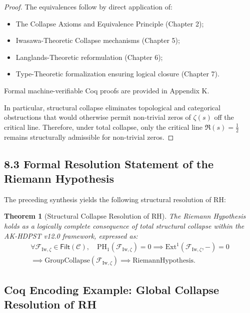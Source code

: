 \documentclass[11pt]{article}
\newtheorem{theorem}{Theorem}[section]
\begin{document}
\begin{proof}
The equivalences follow by direct application of:
\begin{itemize}
    \item The Collapse Axioms and Equivalence Principle (Chapter 2);
    \item Iwasawa-Theoretic Collapse mechanisms (Chapter 5);
    \item Langlands-Theoretic reformulation (Chapter 6);
    \item Type-Theoretic formalization ensuring logical closure (Chapter 7).
\end{itemize}
Formal machine-verifiable Coq proofs are provided in Appendix K.

In particular, structural collapse eliminates topological and categorical obstructions that would otherwise permit non-trivial zeros of $\zeta(s)$ off the critical line. Therefore, under total collapse, only the critical line $\Re(s) = \tfrac{1}{2}$ remains structurally admissible for non-trivial zeros.
\end{proof}

\subsection*{8.3 Formal Resolution Statement of the Riemann Hypothesis}

The preceding synthesis yields the following structural resolution of RH:

\begin{theorem}[Structural Collapse Resolution of RH]
The Riemann Hypothesis holds as a logically complete consequence of total structural collapse within the AK-HDPST v12.0 framework, expressed as:
\begin{multline*}
\forall \mathcal{F}_{\mathrm{Iw}, \zeta} \in \mathsf{Filt}(\mathcal{C}), \quad 
\mathrm{PH}_1(\mathcal{F}_{\mathrm{Iw}, \zeta}) = 0 
\implies \mathrm{Ext}^1(\mathcal{F}_{\mathrm{Iw}, \zeta}, -) = 0 \\
\implies \mathrm{GroupCollapse}(\mathcal{F}_{\mathrm{Iw}, \zeta}) 
\implies \mathrm{RiemannHypothesis}.
\end{multline*}

\end{theorem}

\subsection*{Coq Encoding Example: Global Collapse Resolution of RH}
\end{document}
